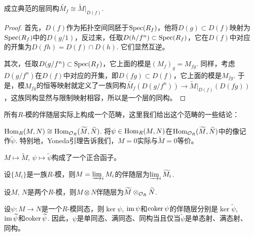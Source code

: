 \begin{pro}
成立典范的层同构$\widetilde{M_f}\cong \widetilde{M}|_{D(f)}$. 
\end{pro}

\begin{proof}
首先，$D(f)$作为拓扑空间同胚于$\operatorname{Spec}(R_f)$，他将$D(g)\subset D(f)$映射为$\operatorname{Spec}(R_f)$中的$D(g/1)$，反过来，任取$D(h/f^n)\subset \operatorname{Spec}(R_f)$，它在$D(f)$中对应的开集为$D(fh)=D(f)\cap D(h)$. 它们显然互逆。

其次，任取$D(g/f^n)\subset \operatorname{Spec}(R_f)$，它上面的模是$(M_f)_g=M_{fg}$. 同样，考虑$D(g/f^n)$在$D(f)$中对应的开集，即$D(fg)\subset D(f)$，它上面的模是$M_{fg}$. 于是，模$M_{fg}$的恒等映射就定义了一族同构$\widetilde{M_f}(D(g/f^n))\to \widetilde{M}|_{D(f)}(D(fg))$，这族同构显然与限制映射相容，所以是一个层的同构。
\end{proof}

\begin{pro}所有$R$-模的伴随层实际上构成一个范畴，这里我们给出这个范畴的一些结论：
\begin{compactenum}[~~~1.]
\item $\operatorname{Hom}_R(M,N)\cong \operatorname{Hom}_{\mathcal{O}_R}(\widetilde{M},\widetilde{N})$. 将$\psi\in\operatorname{Hom}_R(M,N)$在$\operatorname{Hom}_{\mathcal{O}_R}(\widetilde{M},\widetilde{N})$中的像记作$\widetilde{\psi}$. 特别地，Yoneda引理告诉我们，$M=0$实际与$\widetilde{M}=0$等价。
\item $M\mapsto \widetilde{M}$, $\psi\mapsto \widetilde{\psi}$构成了一个正合函子。
\item 设$\{M_i\}$是一族$R$-模，则$M=\varinjlim_{i}M_i$的伴随层为$\varinjlim_{i} \widetilde{M_i}$.
\item 设$M$, $N$是两个$R$-模，则$M\otimes N$伴随层为$\widetilde{M}\otimes_{\mathcal{O}_R}\widetilde{N}$.
\item 设$\psi:M\to N$是一个$R$-模同态，则$\ker \psi$, $\operatorname{im} \psi$和$\operatorname{coker} \psi$的伴随层分别是$\ker \widetilde{\psi}$, $\operatorname{im} \widetilde{\psi}$和$\operatorname{coker} \widetilde{\psi}$. 因此，$\psi$是单同态、满同态、同构当且仅当$\widetilde{\psi}$是单态射、满态射、同构。
\end{compactenum}
\end{pro}

